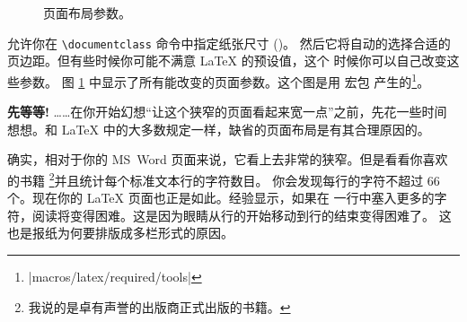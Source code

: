 \begin{figure}[!hp]
\begin{center}
\makeatletter\@mylayout\makeatother
\end{center}
\vspace*{1.8cm}
\caption{页面布局参数。}
\label{fig:layout}
\end{figure}
\LaTeXe{} 允许你在 \verb|\documentclass| 命令中指定纸张尺寸 ()。
然后它将自动的选择合适的页边距。但有些时候你可能不满意 \LaTeX{} 的预设值，这个
时候你可以自己改变这些参数。
\thispagestyle{fancyplain}
图 \ref{fig:layout} 中显示了所有能改变的页面参数。这个图是用  宏包
产生的\footnote{\CTANref|macros/latex/required/tools|}。

\textbf{先等等!} ……在你开始幻想“让这个狭窄的页面看起来宽一点”之前，先花一些时间
想想。和 \LaTeX{} 中的大多数规定一样，缺省的页面布局是有其合理原因的。

确实，相对于你的 MS\ Word 页面来说，它看上去非常的狭窄。但是看看你喜欢的书籍
\footnote{我说的是卓有声誉的出版商正式出版的书籍。}并且统计每个标准文本行的字符数目。
你会发现每行的字符不超过 66 个。现在你的 \LaTeX{} 页面也正是如此。经验显示，如果在
一行中塞入更多的字符，阅读将变得困难。这是因为眼睛从行的开始移动到行的结束变得困难了。
这也是报纸为何要排版成多栏形式的原因。

